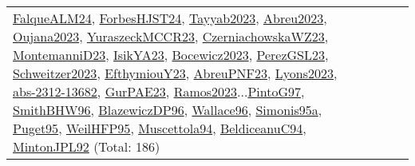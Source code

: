{\begin{longtable}{p{3cm}r>{\raggedright\arraybackslash}p{6cm}>{\raggedright\arraybackslash}p{6cm}>{\raggedright\arraybackslash}p{8cm}}
\hyperref[detail:FalqueALM24]{FalqueALM24}, \hyperref[detail:ForbesHJST24]{ForbesHJST24}, \hyperref[detail:Tayyab2023]{Tayyab2023}, \hyperref[detail:Abreu2023]{Abreu2023}, \hyperref[detail:Oujana2023]{Oujana2023}, \hyperref[detail:YuraszeckMCCR23]{YuraszeckMCCR23}, \hyperref[detail:CzerniachowskaWZ23]{CzerniachowskaWZ23}, \hyperref[detail:MontemanniD23]{MontemanniD23}, \hyperref[detail:IsikYA23]{IsikYA23}, \hyperref[detail:Bocewicz2023]{Bocewicz2023}, \hyperref[detail:PerezGSL23]{PerezGSL23}, \hyperref[detail:Schweitzer2023]{Schweitzer2023}, \hyperref[detail:EfthymiouY23]{EfthymiouY23}, \hyperref[detail:AbreuPNF23]{AbreuPNF23}, \hyperref[detail:Lyons2023]{Lyons2023}, \hyperref[detail:abs-2312-13682]{abs-2312-13682}, \hyperref[detail:GurPAE23]{GurPAE23}, \hyperref[detail:Ramos2023]{Ramos2023}...\hyperref[detail:PintoG97]{PintoG97}, \hyperref[detail:SmithBHW96]{SmithBHW96}, \hyperref[detail:BlazewiczDP96]{BlazewiczDP96}, \hyperref[detail:Wallace96]{Wallace96}, \hyperref[detail:Simonis95a]{Simonis95a}, \hyperref[detail:Puget95]{Puget95}, \hyperref[detail:WeilHFP95]{WeilHFP95}, \hyperref[detail:Muscettola94]{Muscettola94}, \hyperref[detail:BeldiceanuC94]{BeldiceanuC94}, \hyperref[detail:MintonJPL92]{MintonJPL92} (Total: 186)\\

\end{longtable}}
